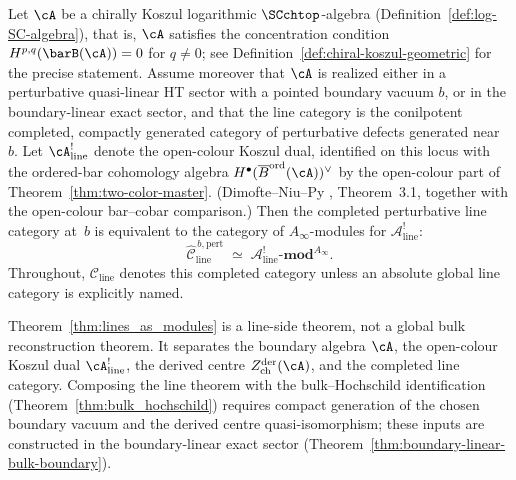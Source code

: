 \begin{theorem}
\label{thm:lines_as_modules}
Let\/ $\cA$ be a chirally Koszul logarithmic $\SCchtop$-algebra
\textup{(}Definition~\textup{\ref{def:log-SC-algebra})}, that is,
$\cA$ satisfies the concentration condition
$H^{p,q}(\barB(\cA))=0$ for $q\neq 0$; see
Definition~\textup{\ref{def:chiral-koszul-geometric}} for the precise
statement. Assume moreover that $\cA$ is realized either in a
perturbative quasi-linear HT sector with a pointed boundary vacuum
$b$, or in the boundary-linear exact sector, and that the line category
is the conilpotent completed, compactly generated category of
perturbative defects generated near~$b$. Let\/
$\cA^!_{\mathrm{line}}$ denote the open-colour Koszul dual, identified
on this locus with the
ordered-bar cohomology algebra
$H^\bullet(\overline{B}^{\mathrm{ord}}(\cA))^\vee$ by the
open-colour part of Theorem~\ref{thm:two-color-master}.
(Dimofte--Niu--Py \cite{DNP25}, Theorem~3.1, together with the
open-colour bar--cobar comparison.) Then the completed perturbative
line category at~$b$ is equivalent to the category of
$A_\infty$-modules for $\mathcal{A}^!_{\mathrm{line}}$:
\begin{equation}
\widehat{\mathcal{C}}^{\,b,\mathrm{pert}}_{\mathrm{line}}
\;\simeq\;
\mathcal{A}^!_{\mathrm{line}}\text{-}\mathbf{mod}^{A_\infty}.
\end{equation}
Throughout, $\mathcal{C}_{\mathrm{line}}$ denotes this completed
category unless an absolute global line category is explicitly named.
\end{theorem}

\begin{remark}
\label{rem:lines-modules-scope}
Theorem~\ref{thm:lines_as_modules} is a line-side theorem, not a
global bulk reconstruction theorem. It separates the boundary algebra
$\cA$, the open-colour Koszul dual $\cA^!_{\mathrm{line}}$, the
derived centre $Z^{\mathrm{der}}_{\mathrm{ch}}(\cA)$, and the
completed line category. Composing the line theorem with the
bulk--Hochschild identification (Theorem~\ref{thm:bulk_hochschild})
requires compact generation of the chosen boundary vacuum and the
derived centre quasi-isomorphism; these inputs are constructed in the
boundary-linear exact sector
(Theorem~\ref{thm:boundary-linear-bulk-boundary}).
\end{remark}

